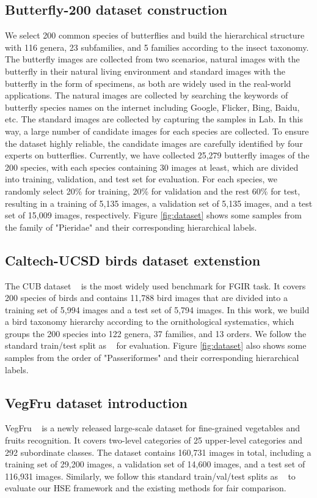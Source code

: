 \documentclass[sigconf]{acmart}
\begin{document}
\subsection{Butterfly-200 dataset construction}
We select 200 common species of butterflies and build the hierarchical structure with 116 genera, 23 subfamilies, and 5 families according to the insect taxonomy. The butterfly images are collected from two scenarios, natural images with the butterfly in their natural living environment and standard images with the butterfly in the form of specimens, as both are widely used in the real-world applications. The natural images are collected by searching the keywords of butterfly species names on the internet including Google, Flicker, Bing, Baidu, etc. The standard images are collected by capturing the samples in Lab. In this way, a large number of candidate images for each species are collected. To ensure the dataset highly reliable, the candidate images are carefully identified by four experts on butterflies. Currently, we have collected 25,279 butterfly images of the 200 species, with each species containing 30 images at least, which are divided into training, validation, and test set for evaluation. For each species, we randomly select 20\% for training, 20\% for validation and the rest 60\% for test, resulting in a training of 5,135 images, a validation set of 5,135 images, and a test set of 15,009 images, respectively. Figure \ref{fig:dataset} shows some samples from the family of "Pieridae" and their corresponding hierarchical labels. 


\subsection{Caltech-UCSD birds dataset extenstion}
The CUB dataset ~\cite{wah2011caltech} is the most widely used benchmark for FGIR task. It covers 200 species of birds and contains 11,788 bird images that are divided into a training set of 5,994 images and a test set of 5,794 images. In this work, we build a bird taxonomy hierarchy according to the ornithological systematics, which groups the 200 species into 122 genera, 37 families, and 13 orders. We follow the standard train/test split as ~\cite{wah2011caltech} for evaluation. Figure \ref{fig:dataset} also shows some samples from the order of "Passeriformes" and their corresponding hierarchical labels.

\subsection{VegFru dataset introduction}
VegFru ~\cite{hou2017vegfru} is a newly released large-scale dataset for fine-grained vegetables and fruits recognition. It covers two-level categories of 25 upper-level categories and 292 subordinate classes. The dataset contains 160,731 images in total, including a training set of 29,200 images, a validation set of 14,600 images, and a test set of 116,931 images. Similarly, we follow this standard train/val/test splits as ~\cite{hou2017vegfru} to evaluate our HSE framework and the existing methods for fair comparison. 
\end{document}
